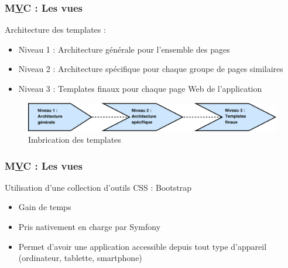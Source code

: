 \begin{frame}
\frametitle{M\underline{V}C : Les vues}
Architecture des templates :
\begin{itemize}
\item Niveau 1 : Architecture générale pour l'ensemble des pages
\item Niveau 2 : Architecture spécifique pour chaque groupe de pages similaires
\item Niveau 3 : Templates finaux pour chaque page Web de l'application
\end{itemize}
\begin{figure}[!h]
	\begin{center}
	\includegraphics[scale=0.3]{images/archiTemplates}
	\caption{Imbrication des templates}
	\end{center}
\end{figure}
\end{frame}

\begin{frame}
\frametitle{M\underline{V}C : Les vues}
Utilisation d'une collection d'outils CSS : Bootstrap
\begin{itemize}
\item Gain de temps
\item Pris nativement en charge par Symfony
\item Permet d'avoir une application accessible depuis tout type d'appareil (ordinateur, tablette, smartphone)
\end{itemize}
\end{frame}

